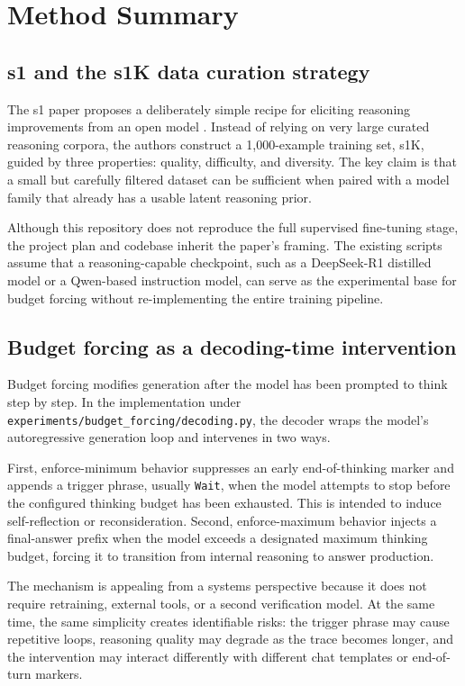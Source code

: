 \section{Method Summary}\label{sec:method}

\subsection{s1 and the s1K data curation strategy}

The s1 paper proposes a deliberately simple recipe for eliciting reasoning improvements from an open model \citep{muennighoff2025s1}. Instead of relying on very large curated reasoning corpora, the authors construct a 1,000-example training set, s1K, guided by three properties: quality, difficulty, and diversity. The key claim is that a small but carefully filtered dataset can be sufficient when paired with a model family that already has a usable latent reasoning prior.

Although this repository does not reproduce the full supervised fine-tuning stage, the project plan and codebase inherit the paper's framing. The existing scripts assume that a reasoning-capable checkpoint, such as a DeepSeek-R1 distilled model or a Qwen-based instruction model, can serve as the experimental base for budget forcing without re-implementing the entire training pipeline.

\subsection{Budget forcing as a decoding-time intervention}

Budget forcing modifies generation after the model has been prompted to think step by step. In the implementation under \texttt{experiments/budget\_forcing/decoding.py}, the decoder wraps the model's autoregressive generation loop and intervenes in two ways.

First, enforce-minimum behavior suppresses an early end-of-thinking marker and appends a trigger phrase, usually \texttt{Wait}, when the model attempts to stop before the configured thinking budget has been exhausted. This is intended to induce self-reflection or reconsideration. Second, enforce-maximum behavior injects a final-answer prefix when the model exceeds a designated maximum thinking budget, forcing it to transition from internal reasoning to answer production.

The mechanism is appealing from a systems perspective because it does not require retraining, external tools, or a second verification model. At the same time, the same simplicity creates identifiable risks: the trigger phrase may cause repetitive loops, reasoning quality may degrade as the trace becomes longer, and the intervention may interact differently with different chat templates or end-of-turn markers.

